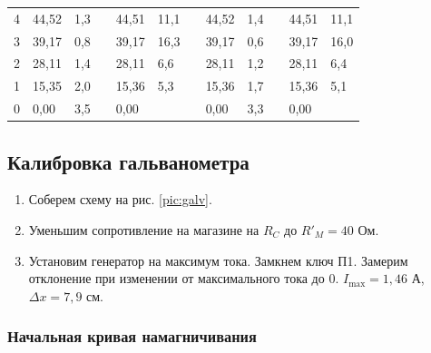 \documentclass[a4paper,12pt]{article}
\begin{document}
\begin{table}[!h]
\begin{tabular}{|l|l|l|l|l|l|l|l|l|l|l|l|}
        4         & 44,52                  & 1,3     &  & 44,51                  & 11,1    &  & 44,52                  & 1,4                   &  & 44,51                  & 11,1    \\ \cline{1-3} \cline{5-6} \cline{8-9} \cline{11-12} 
        3         & 39,17                  & 0,8     &  & 39,17                  & 16,3    &  & 39,17                  & 0,6                   &  & 39,17                  & 16,0    \\ \cline{1-3} \cline{5-6} \cline{8-9} \cline{11-12} 
        2         & 28,11                  & 1,4     &  & 28,11                  & 6,6     &  & 28,11                  & 1,2                   &  & 28,11                  & 6,4     \\ \cline{1-3} \cline{5-6} \cline{8-9} \cline{11-12} 
        1         & 15,35                  & 2,0     &  & 15,36                  & 5,3     &  & 15,36                  & 1,7                   &  & 15,36                  & 5,1     \\ \cline{1-3} \cline{5-6} \cline{8-9} \cline{11-12} 
        0         & 0,00                   & 3,5     &  & 0,00                   &         &  & 0,00                   & 3,3                   &  & 0,00                   &         \\ \cline{1-3} \cline{5-6} \cline{8-9} \cline{11-12} 
    \end{tabular}
    \label{table:1}
\end{table}

\FloatBarrier

\subsection{Калибровка гальванометра}

\begin{enumerate}[resume]
    \item Соберем схему на рис. \ref{pic:galv}.
    \item Уменьшим сопротивление на магазине на $R_C$ до $R'_M = 40$ Ом.
    \item Установим генератор на максимум тока. Замкнем ключ П1. Замерим отклонение при изменении от максимального тока до 0. $I_\text{max} = 1,46$ А, $\Delta x = 7,9$ см.
\end{enumerate}

\subsubsection{Начальная кривая намагничивания}
\end{document}
